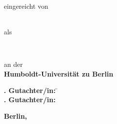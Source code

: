 \makeatletter
\begin{titlepage}
\doublespacing\centering%
\vspace*{-24.5mm}\noindent\makebox[\textwidth]{\phantom{Vadid Gissnkra}\hspace*{-19mm}}

\textbf{\Huge\sffamily \@title}\vskip 2.5mm

\textbf{\Large\sffamily \@subtitle}\vfill

{\large eingereicht von}\\
\resizebox{%
      \ifdim\width>\textwidth
        \textwidth
      \else
        \width
      \fi
    }{!}{%
    \textbf{\Large\sffamily \@author}}\\\vfill%

{\large als}\\
    \textbf{\Large\sffamily\degreevar}\vfill

{\large\degreecontextvar}\\
\resizebox{%
      \ifdim\width>\textwidth
        \textwidth
      \else
        \width
      \fi
    }{!}{%
    \textbf{\Large\sffamily\programmevar}}\vfill

{\large an der}\\
\textbf{\Large\sffamily Humboldt-Universität zu Berlin}\vfill

\resizebox{%
      \ifdim\width>\textwidth
        \textwidth
      \else
        \width
      \fi
    }{!}{%
    \textbf{\Large\sffamily\facultyvar}}

\resizebox{%
      \ifdim\width>\textwidth
        \textwidth
      \else
        \width
      \fi
    }{!}{%
    \textbf{\Large\sffamily\institutevar}}\vfill

\parbox{0cm}{\large%
    \begin{tabbing}
        \textbf{. Gutachter/in:} \= \firstsupervisorvar\\
        \textbf{. Gutachter/in:} \> \secondsupervisorvar
    \end{tabbing}
}\vfill


\enlargethispage{16mm}\textbf{\large\sffamily Berlin, \@date}
\end{titlepage}
\makeatother